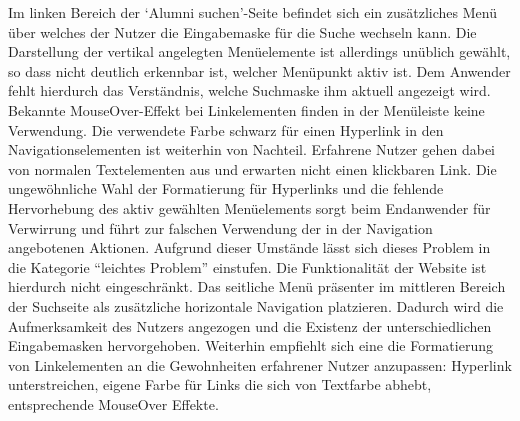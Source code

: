 
{
	Im linken Bereich der ‘Alumni suchen’-Seite befindet sich ein zusätzliches Menü über welches der Nutzer die Eingabemaske für die Suche wechseln kann. Die Darstellung der vertikal angelegten Menüelemente ist allerdings unüblich gewählt, so dass nicht deutlich erkennbar ist, welcher Menüpunkt aktiv ist. Dem Anwender fehlt hierdurch das Verständnis, welche Suchmaske ihm aktuell angezeigt wird. Bekannte MouseOver-Effekt bei Linkelementen finden in der Menüleiste keine Verwendung. Die verwendete Farbe schwarz für einen Hyperlink in den Navigationselementen ist weiterhin von Nachteil. Erfahrene Nutzer gehen dabei von normalen Textelementen aus und erwarten nicht einen klickbaren Link.
}
{
	Die ungewöhnliche Wahl der Formatierung für Hyperlinks und die fehlende Hervorhebung des aktiv gewählten Menüelements sorgt beim Endanwender für Verwirrung und führt zur falschen Verwendung der in der Navigation angebotenen Aktionen. Aufgrund dieser Umstände lässt sich dieses Problem in die Kategorie “leichtes Problem” einstufen. Die Funktionalität der Website ist hierdurch nicht eingeschränkt.
}
{
	Das seitliche Menü präsenter im mittleren Bereich der Suchseite als zusätzliche horizontale Navigation platzieren. Dadurch wird die Aufmerksamkeit des Nutzers angezogen und die Existenz der unterschiedlichen Eingabemasken hervorgehoben. Weiterhin empfiehlt sich eine die Formatierung von Linkelementen an die Gewohnheiten erfahrener Nutzer anzupassen: Hyperlink unterstreichen, eigene Farbe für Links die sich von Textfarbe abhebt, entsprechende MouseOver Effekte.
}




